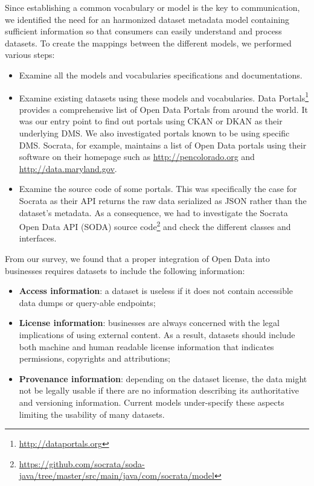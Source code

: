 \documentclass[a4paper,11pt,twoside]{ThesisStyle}
\begin{document}
Since establishing a common vocabulary or model is the key to communication, we identified the need for an harmonized dataset metadata model containing sufficient information so that consumers can easily understand and process datasets. To create the mappings between the different models, we performed various steps:
\begin{itemize}
  \item Examine all the models and vocabularies specifications and documentations.
  \item Examine existing datasets using these models and vocabularies. Data Portals\footnote{\url{http://dataportals.org}} provides a comprehensive list of Open Data Portals from around the world. It was our entry point to find out portals using CKAN or DKAN as their underlying DMS. We also investigated portals known to be using specific DMS. Socrata, for example, maintains a list of Open Data portals using their software on their homepage such as \url{http://pencolorado.org} and \url{http://data.maryland.gov}.
  \item Examine the source code of some portals. This was specifically the case for Socrata as their API returns the raw data serialized as JSON rather than the dataset's metadata. As a consequence, we had to investigate the Socrata Open Data API (SODA) source code\footnote{\url{https://github.com/socrata/soda-java/tree/master/src/main/java/com/socrata/model}} and check the different classes and interfaces.
\end{itemize}

From our survey, we found that a proper integration of Open Data into businesses requires datasets to include the following information:
\begin{itemize}
	\item \textbf{Access information}: a dataset is useless if it does not contain accessible data dumps or query-able endpoints;
	\item \textbf{License information}: businesses are always concerned with the legal implications of using external content. As a result, datasets should include both machine and human readable license information that indicates permissions, copyrights and attributions;
	\item \textbf{Provenance information}: depending on the dataset license, the data might not be legally usable if there are no information describing its authoritative and versioning information. Current models under-specify these aspects limiting the usability of many datasets.
\end{itemize}
\end{document}
